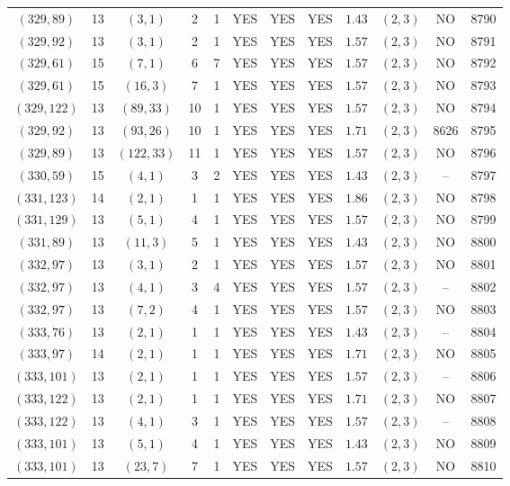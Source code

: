 \begin{longtable}{|c|c|c|c|c|c|c|c|c|c|c|c|}
$(329,89)$ & 13 & $(3,1)$ & 2 & 1 & YES & YES & YES & $1.43$ & $(2,3)$ & NO & 8790\\
$(329,92)$ & 13 & $(3,1)$ & 2 & 1 & YES & YES & YES & $1.57$ & $(2,3)$ & NO & 8791\\
$(329,61)$ & 15 & $(7,1)$ & 6 & 7 & YES & YES & YES & $1.57$ & $(2,3)$ & NO & 8792\\
$(329,61)$ & 15 & $(16,3)$ & 7 & 1 & YES & YES & YES & $1.57$ & $(2,3)$ & NO & 8793\\
$(329,122)$ & 13 & $(89,33)$ & 10 & 1 & YES & YES & YES & $1.57$ & $(2,3)$ & NO & 8794\\
$(329,92)$ & 13 & $(93,26)$ & 10 & 1 & YES & YES & YES & $1.71$ & $(2,3)$ & 8626 & 8795\\
$(329,89)$ & 13 & $(122,33)$ & 11 & 1 & YES & YES & YES & $1.57$ & $(2,3)$ & NO & 8796\\
$(330,59)$ & 15 & $(4,1)$ & 3 & 2 & YES & YES & YES & $1.43$ & $(2,3)$ & -- & 8797\\
$(331,123)$ & 14 & $(2,1)$ & 1 & 1 & YES & YES & YES & $1.86$ & $(2,3)$ & NO & 8798\\
$(331,129)$ & 13 & $(5,1)$ & 4 & 1 & YES & YES & YES & $1.57$ & $(2,3)$ & NO & 8799\\
$(331,89)$ & 13 & $(11,3)$ & 5 & 1 & YES & YES & YES & $1.43$ & $(2,3)$ & NO & 8800\\
$(332,97)$ & 13 & $(3,1)$ & 2 & 1 & YES & YES & YES & $1.57$ & $(2,3)$ & NO & 8801\\
$(332,97)$ & 13 & $(4,1)$ & 3 & 4 & YES & YES & YES & $1.57$ & $(2,3)$ & -- & 8802\\
$(332,97)$ & 13 & $(7,2)$ & 4 & 1 & YES & YES & YES & $1.57$ & $(2,3)$ & NO & 8803\\
$(333,76)$ & 13 & $(2,1)$ & 1 & 1 & YES & YES & YES & $1.43$ & $(2,3)$ & -- & 8804\\
$(333,97)$ & 14 & $(2,1)$ & 1 & 1 & YES & YES & YES & $1.71$ & $(2,3)$ & NO & 8805\\
$(333,101)$ & 13 & $(2,1)$ & 1 & 1 & YES & YES & YES & $1.57$ & $(2,3)$ & -- & 8806\\
$(333,122)$ & 13 & $(2,1)$ & 1 & 1 & YES & YES & YES & $1.71$ & $(2,3)$ & NO & 8807\\
$(333,122)$ & 13 & $(4,1)$ & 3 & 1 & YES & YES & YES & $1.57$ & $(2,3)$ & -- & 8808\\
$(333,101)$ & 13 & $(5,1)$ & 4 & 1 & YES & YES & YES & $1.43$ & $(2,3)$ & NO & 8809\\
$(333,101)$ & 13 & $(23,7)$ & 7 & 1 & YES & YES & YES & $1.57$ & $(2,3)$ & NO & 8810\\

\end{longtable}
